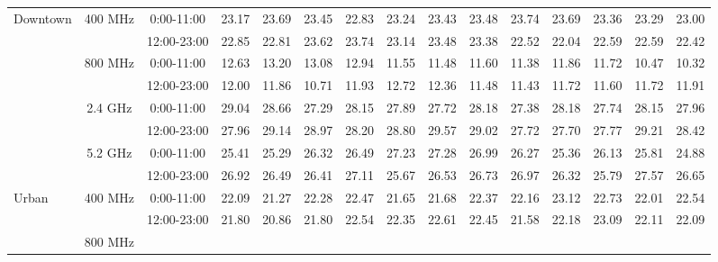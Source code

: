 \begin{table}
\centering %
\begin{tabular}{|l|c|c|c|c|c|c|c|c|c|c|c|c|c|c|} %
\hline %
\hline %
\multirow{8}{*}{Downtown}	
&\multirow{2}{*}{400 MHz}	
&0:00-11:00 &  23.17 &  23.69 &  23.45 &  22.83 &  23.24 &  23.43&  23.48 &  23.74&  23.69 &  23.36&  23.29 &  23.00 \\ 	
\cline{3-15}	
&&12:00-23:00&  22.85 &  22.81 &  23.62 &  23.74 &  23.14 &  23.48&  23.38 &  22.52&  22.04 &  22.59&  22.59 &  22.42 \\ 	
\cline{2-15}	
&\multirow{2}{*}{800 MHz}	
&0:00-11:00 &  12.63 &  13.20 &  13.08 &  12.94 &  11.55 &  11.48&  11.60 &  11.38&  11.86 &  11.72&  10.47 &  10.32 \\ 	
\cline{3-15}	
&&12:00-23:00&  12.00 &  11.86 &  10.71 &  11.93 &  12.72 &  12.36&  11.48 &  11.43&  11.72 &  11.60&  11.72 &  11.91 \\ 	
\cline{2-15}	
&\multirow{2}{*}{2.4 GHz}	
&0:00-11:00 &  29.04 &  28.66 &  27.29 &  28.15 &  27.89 &  27.72&  28.18 &  27.38&  28.18 &  27.74&  28.15 &  27.96 \\ 	
\cline{3-15}	
&&12:00-23:00&  27.96 &  29.14 &  28.97 &  28.20 &  28.80 &  29.57&  29.02 &  27.72&  27.70 &  27.77&  29.21 &  28.42 \\ 	
\cline{2-15}	
&\multirow{2}{*}{5.2 GHz}	
&0:00-11:00 &  25.41 &  25.29 &  26.32 &  26.49 &  27.23 &  27.28&  26.99 &  26.27&  25.36 &  26.13&  25.81 &  24.88 \\ 	
\cline{3-15}	
&&12:00-23:00&  26.92 &  26.49 &  26.41 &  27.11 &  25.67 &  26.53&  26.73 &  26.97&  26.32 &  25.79&  27.57 &  26.65 \\ 	
\hline	
\multirow{8}{*}{Urban}	
&\multirow{2}{*}{400 MHz}	
&0:00-11:00 &  22.09 &  21.27 &  22.28 &  22.47 &  21.65 &  21.68&  22.37 &  22.16&  23.12 &  22.73&  22.01 &  22.54 \\ 	
\cline{3-15}	
&&12:00-23:00&  21.80 &  20.86 &  21.80 &  22.54 &  22.35 &  22.61&  22.45 &  21.58&  22.18 &  23.09&  22.11 &  22.09 \\ 	
\cline{2-15}	
&\multirow{2}{*}{800 MHz}	

\end{tabular}
\end{table}
